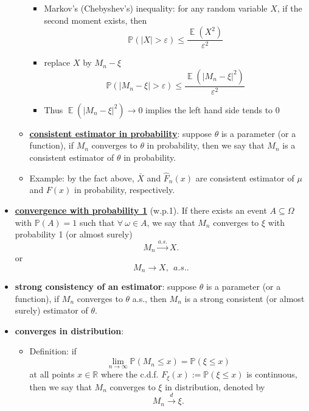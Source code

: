 \documentclass[19pt,landscaoe]{article}
\newcommand{\IP}{\mathbb{P}}
\DeclareMathOperator{\E}{\mathbb{E}}
\newcommand{\R}{\mathbb{R}}
\begin{document}
\begin{itemize}
\begin{itemize}
    \begin{itemize}
    
    \item   Markov's (Chebyshev's) inequality: for any random variable $ X$, if the second moment exists, then
    $$
     \IP(|X|>\varepsilon) \le \frac{\E(X^2)}{\varepsilon^2}
    $$
    
    \item replace $ X $ by $M_n - \xi $
    $$
     \IP(|M_n - \xi |>\varepsilon) \le \frac{\E(|M_n - \xi |^2)}{\varepsilon^2}
    $$
     
    \item Thus $\E(|M_n - \xi |^2) \to 0$ implies the left hand side tends to 0
    
    \end{itemize} 

\newpage

\item \underline{\bf consistent estimator in probability}:  suppose $ \theta $ is a parameter (or a function), if $ M_n $ converges to $ \theta $ in probability, then we say that $ M_n $ is a consistent estimator of $
\theta $ in probability. 

\item Example: by the fact above, $ \bar X $  and $ \hat F_n(x) $  are consistent estimator of $ \mu $ and $ F(x) $ in probability, respectively.

\end{itemize}
\item  \underline{\bf convergence with probability 1} (w.p.1). If there exists an event $A\subseteq\Omega$ with $\IP(A)=1$ such that $\forall~\omega\in A$, we say that $ M_n $ converges to $ \xi $ with probability 1 (or almost surely)
$$
M_n \stackrel{a.s.}{\rightarrow} X.
$$
or 
$$
M_n {\rightarrow} X, \ \  a.s. .
$$

\item[] {\bf strong consistency of an estimator}:  suppose $ \theta $ is a parameter (or a function), if $ M_n $ converges to $ \theta $ a.s., then $ M_n $ is a strong consistent (or almost surely) estimator of $  \theta $.

\item {\bf  converges in distribution}:
\begin{itemize}
  \item  Definition: 
 if 
$$
\lim_{n\to \infty } \IP(M_n\le x) = \IP(\xi\le x)
$$
at all points $x\in\R$ where the c.d.f. $F_\xi(x):=\IP(\xi\le x)$ is continuous, 
then we say that $ M_n $ converges to $ \xi$ in distribution, denoted by
$$
M_n \stackrel{d}{\rightarrow} \xi. 
$$


\end{itemize}
\end{itemize}
\end{document}
